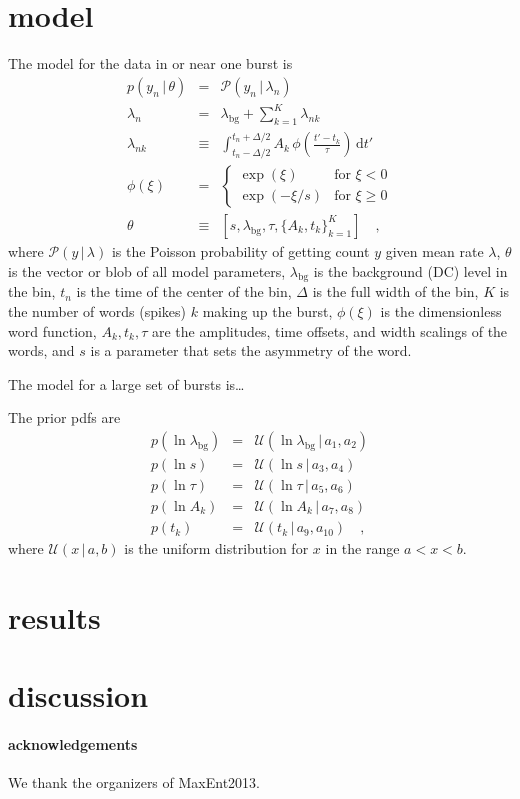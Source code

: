 \documentclass[12pt]{article}
\newcommand{\given}{\,|\,}
\newcommand{\dd}{\mathrm{d}}
\renewcommand{\count}{y}
\newcommand{\pars}{\theta}
\newcommand{\mean}{\lambda}
\newcommand{\Poisson}{{\mathcal P}}
\newcommand{\Uniform}{{\mathcal U}}
\newcommand{\bg}{\mathrm{bg}}
\newcommand{\word}{\phi}
\begin{document}
\section{model}

The model for the data in or near one burst is
\begin{eqnarray}
p(\count_n\given\pars) &=& \Poisson(\count_n\given\mean_n)
\\
\mean_n &=& \mean_{\bg} + \sum_{k=1}^K \mean_{nk}
\\
\mean_{nk} &\equiv& \int_{t_n-\Delta/2}^{t_n+\Delta/2} A_k\,\word(\frac{t'-t_k}{\tau})\,\dd t'
\\
\word(\xi) &=& \left\{\begin{array}{ll}\exp(\xi) & \mbox{for $\xi<0$}\\ \exp(-\xi/s) & \mbox{for $\xi\geq 0$}\end{array}\right.
\\
\theta &\equiv& [s, \mean_{\bg}, \tau, \{A_k, t_k\}_{k=1}^K ]
\quad,
\end{eqnarray}
where $\Poisson(\count\given\mean)$ is the Poisson probability of getting count $y$ given mean rate $\mean$,
  $\pars$ is the vector or blob of all model parameters,
  $\mean_{\bg}$ is the background (DC) level in the bin,
  $t_n$ is the time of the center of the bin,
  $\Delta$ is the full width of the bin,
  $K$ is the number of words (spikes) $k$ making up the burst,
  $\phi(\xi)$ is the dimensionless word function,
  $A_k, t_k, \tau$ are the amplitudes, time offsets, and width scalings of the words,
  and $s$ is a parameter that sets the asymmetry of the word.

The model for a large set of bursts is\ldots

The prior pdfs are
\begin{eqnarray}
p(\ln\lambda_{\bg}) &=& \Uniform(\ln\lambda_{\bg}\given a_1, a_2)
\\
p(\ln s) &=& \Uniform(\ln s\given a_3, a_4)
\\
p(\ln\tau) &=& \Uniform(\ln\tau\given a_5, a_6)
\\
p(\ln A_k) &=& \Uniform(\ln A_k\given a_7, a_8)
\\
p(t_k) &=& \Uniform(t_k\given a_9, a_{10})
\quad,
\end{eqnarray}
where $\Uniform(x\given a, b)$ is the uniform distribution for $x$ in the range $a<x<b$.

\section{results}

\section{discussion}

\paragraph{acknowledgements}
We thank the organizers of MaxEnt2013.
\end{document}
